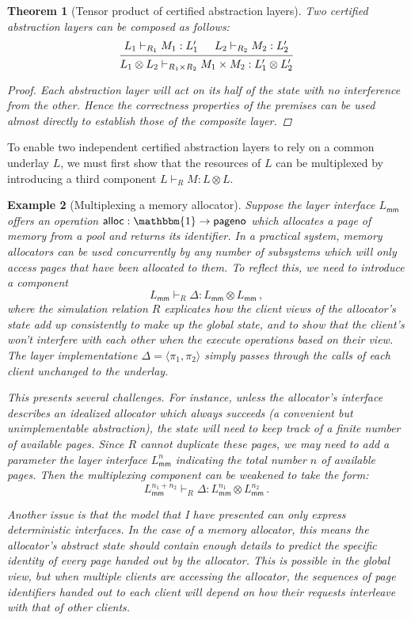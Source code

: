 \documentclass[11pt,oneside,draft]{book}
\newtheorem{theorem}{Theorem}[chapter]
\newtheorem{example}[theorem]{Example}
\theoremstyle{definition}
\newcommand{\kw}[1]{\ensuremath{ \mathsf{#1} }}
\begin{document}
\begin{theorem}[Tensor product of certified abstraction layers]
Two certified abstraction layers can be composed as follows:
\[
  \begin{prooftree}
    \hypo{L_1 \vdash_{R_1} M_1 : L_1'}
    \hypo{L_2 \vdash_{R_2} M_2 : L_2'}
    \infer2{L_1 \otimes L_2 \vdash_{R_1 \times R_2}
      M_1 \times M_2 : L_1' \otimes L_2'}
  \end{prooftree}
\]
\begin{proof}
Each abstraction layer
will act on its half of the state
with no interference from the other.
Hence the correctness properties
of the premises
can be used almost directly
to establish those of the composite layer.
\end{proof}
\end{theorem}

To enable two independent
certified abstraction layers
to rely on a common underlay $L$,
we must first show that the resources of $L$
can be multiplexed
by introducing a third component
$L \vdash_R M : L \otimes L$.

\begin{example}[Multiplexing a memory allocator]
Suppose the layer interface $L_\kw{mm}$
offers an operation $\kw{alloc} : \mathbbm{1} \rightarrow \kw{pageno}$
which allocates a page of memory from a pool
and returns its identifier.
In a practical system,
memory allocators can be used concurrently
by any number of subsystems
which will only access pages
that have been allocated to them.
To reflect this,
we need to introduce a component
\[
  L_\kw{mm} \vdash_R \Delta : L_\kw{mm} \otimes L_\kw{mm}
  \,,
\]
where the simulation relation $R$
explicates how the \emph{client views}
of the allocator's state
add up consistently to make up the global state,
and to show that the client's won't interfere with each other
when the execute operations based on their view.
The layer implementatione
$\Delta = \langle \pi_1, \pi_2 \rangle$
simply passes through the calls of each client
unchanged to the underlay.

This presents several challenges.
For instance,
unless the allocator's interface
describes an idealized allocator which always succeeds
(a convenient but unimplementable abstraction),
the state will need to keep track of a finite number of
available pages.
Since $R$ cannot duplicate these pages,
we may need to add a parameter the layer interface $L_\kw{mm}^n$
indicating the total number $n$ of available pages.
Then the multiplexing component can be weakened to
take the form:
\[
  L_\kw{mm}^{n_1 + n_2} \vdash_R \Delta : L_\kw{mm}^{n_1} \otimes L_\kw{mm}^{n_2}
  \,.
\]

Another issue is that the model that I have presented
can only express \emph{deterministic} interfaces.
In the case of a memory allocator,
this means the allocator's abstract state
should contain enough details to predict
the specific identity of
every page handed out by the allocator.
This is possible in the global view,
but when multiple clients are accessing the allocator,
the sequences of page identifiers handed out to each client
will depend on how their requests interleave with that of other clients.
\end{example}
\end{document}
